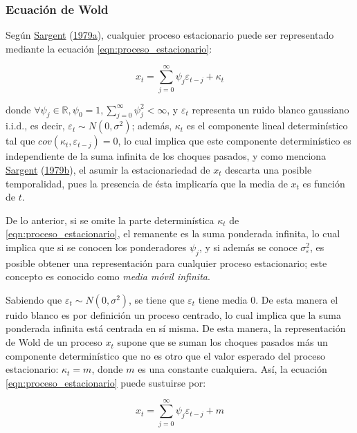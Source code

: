 \documentclass[
]{article}
\begin{document}
\subsubsection{Ecuación de Wold}

Según \protect\hyperlink{ref-sargent_macro}{Sargent}
(\protect\hyperlink{ref-sargent_macro}{1979a}), cualquier proceso
estacionario puede ser representado mediante la ecuación
\eqref{eqn:proceso_estacionario}:

\begin{equation}
\label{eqn:proceso_estacionario}
x_t=\sum_{j=0}^{\infty} \psi_j\varepsilon_{t-j}+\kappa_t
\end{equation}

donde
\(\forall \psi_j \in \mathbb{R}, \psi_0=1, \sum_{j=0}^{\infty} \psi_j^2<\infty\),
y \(\varepsilon_t\) representa un ruido blanco gaussiano i.i.d., es
decir, \(\varepsilon_t \sim N(0, \sigma^2)\); además, \(\kappa_t\) es el
componente lineal determinístico tal que
\(cov(\kappa_t,\varepsilon_{t-j})=0\), lo cual implica que este
componente determinístico es independiente de la suma infinita de los
choques pasados, y como menciona
\protect\hyperlink{ref-sargent_kappa}{Sargent}
(\protect\hyperlink{ref-sargent_kappa}{1979b}), el asumir la
estacionariedad de \(x_t\) descarta una posible temporalidad, pues la
presencia de ésta implicaría que la media de \(x_t\) es función de
\(t\).

De lo anterior, si se omite la parte determinística \(\kappa_t\) de
\eqref{eqn:proceso_estacionario}, el remanente es la suma ponderada
infinita, lo cual implica que si se conocen los ponderadores \(\psi_j\),
y si además se conoce \(\sigma_\varepsilon^2\), es posible obtener una
representación para cualquier proceso estacionario; este concepto es
conocido como \emph{media móvil infinita}.

Sabiendo que \(\varepsilon_t \sim N(0, \sigma^2)\), se tiene que
\(\varepsilon_t\) tiene media 0. De esta manera el ruido blanco es por
definición un proceso centrado, lo cual implica que la suma ponderada
infinita está centrada en sí misma. De esta manera, la representación de
Wold de un proceso \(x_t\) supone que se suman los choques pasados más
un componente determinístico que no es otro que el valor esperado del
proceso estacionario: \(\kappa_t=m\), donde \(m\) es una constante
cualquiera. Así, la ecuación \eqref{eqn:proceso_estacionario} puede
sustuirse por:

\begin{equation}
\label{eqn:proceso_estacionario2}
x_t=\sum_{j=0}^{\infty} \psi_j\varepsilon_{t-j}+m
\end{equation}
\end{document}

